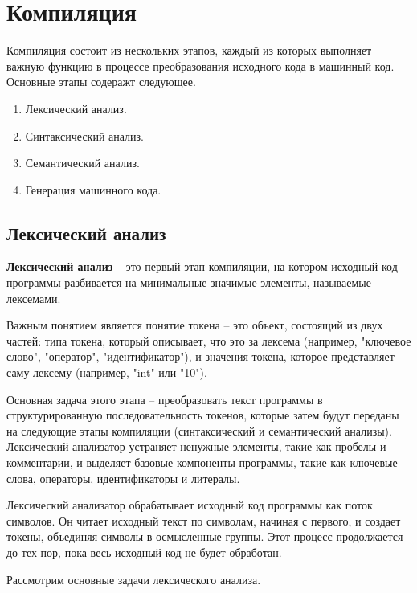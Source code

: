 \section{Компиляция}

Компиляция состоит из нескольких этапов, каждый из которых выполняет важную функцию в процессе преобразования исходного кода в машинный код. Основные этапы содеражт следующее.

\begin{enumerate}
  \item Лексический анализ.
  \item Синтаксический анализ.
  \item Семантический анализ.
  \item Генерация машинного кода.
\end{enumerate}


\subsection{Лексический анализ}

\textbf{Лексический анализ} \cite{lex-analyzer} -- это первый этап компиляции, на котором исходный код программы разбивается на минимальные значимые элементы, называемые лексемами.

Важным понятием является понятие токена -- это объект, состоящий из двух частей: типа токена, который описывает, что это за лексема (например, "ключевое слово", "оператор", "идентификатор"), и значения токена, которое представляет саму лексему (например, "int" или "10").

Основная задача этого этапа -- преобразовать текст программы в структурированную последовательность токенов, которые затем будут переданы на следующие этапы компиляции (синтаксический и семантический анализы). Лексический анализатор устраняет ненужные элементы, такие как пробелы и комментарии, и выделяет базовые компоненты программы, такие как ключевые слова, операторы, идентификаторы и литералы.

Лексический анализатор обрабатывает исходный код программы как поток символов. Он читает исходный текст по символам, начиная с первого, и создает токены, объединяя символы в осмысленные группы. Этот процесс продолжается до тех пор, пока весь исходный код не будет обработан.

Рассмотрим основные задачи лексического анализа.

